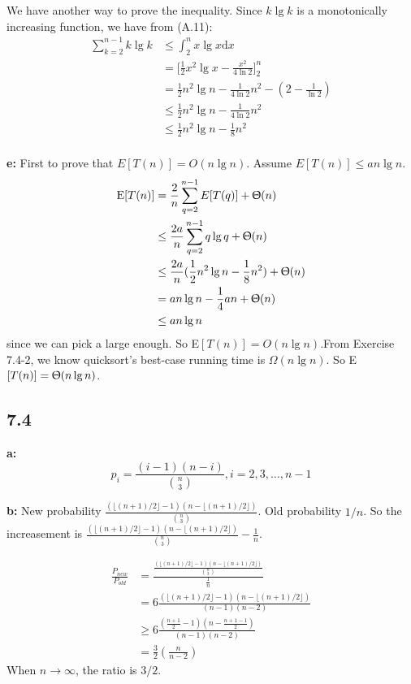 \documentclass{book}
\begin{document}
\begin{CJK}{UTF8}{gkai}
We have another way to prove the inequality. Since $k\lg k$ is a monotonically 
increasing function, we have from (A.11):
\begin{align*}
\sum_{k=2}^{n-1}k\lg k & \le \int_{2}^{n}x\lg x \mathrm{d}x \\
& = \Big[\frac{1}{2}x^2\lg x - \frac{x^2}{4\ln 2}\Big]_2^{n} \\
& = \frac{1}{2}n^2\lg n - \frac{1}{4\ln2}n^2-(2-\frac{1}{\ln2}) \\
& \le \frac{1}{2}n^2\lg n - \frac{1}{4\ln2}n^2 \\
& \le \frac{1}{2}n^2\lg n - \frac{1}{8}n^2 \\
\end{align*}

\textbf{e:} First to prove that $E[T(n)] = O(n\lg n)$. Assume $E[T(n)] \le an\lg 
n$.
\begin{align*}
\text{E}[T(n)] & = \frac{2}{n}\sum_{q=2}^{n-1}E[T(q)] + \Uptheta(n) \\
& \le \frac{2a}{n}\sum_{q=2}^{n-1}q\lg q + \Uptheta(n) \\
& \le \frac{2a}{n}(\frac{1}{2}n^2\lg n - \frac{1}{8}n^2) + \Uptheta(n) \\
& = an\lg n - \frac{1}{4}an + \Uptheta(n) \\
& \le an\lg n
\end{align*}
since we can pick a large enough. So E$[T(n)] = O(n\lg n)$.From Exercise 7.4-2, 
we know quicksort's best-case running time is $\Omega(n\lg n)$. So E$[T(n)] = 
\Uptheta(n \lg n)$.

\subsection*{7.4}
\textbf{a:}
$$p_i = \frac{(i-1)(n-i)}{\binom{n}{3}}, i = 2,3,\dots, n-1$$

\textbf{b:} New probability 
$\frac{(\lfloor(n+1)/2\rfloor-1)(n-\lfloor(n+1)/2\rfloor)}{\binom{n}{3}}$. Old 
probability $1/n$. So the increasement is 
$\frac{(\lfloor(n+1)/2\rfloor-1)(n-\lfloor(n+1)/2\rfloor)}{\binom{n}{3}}-\frac{1}{n}$.

\begin{align*}
\frac{P_{new}}{P_{old}} & = 
\frac{\frac{(\lfloor(n+1)/2\rfloor-1)(n-\lfloor(n+1)/2\rfloor)}{\binom{n}{3}}}{\frac{1}{n}}\\
& = 6\frac{(\lfloor(n+1)/2\rfloor-1)(n-\lfloor(n+1)/2\rfloor)}{(n-1)(n-2)} \\
& \ge 6\frac{(\frac{n+1}{2}-1)(n-\frac{n+1-1}{2})}{(n-1)(n-2)} \\
& = \frac{3}{2}(\frac{n}{n-2})
\end{align*}
When $n \to \infty$, the ratio is $3/2$.


\end{CJK}
\end{document}
